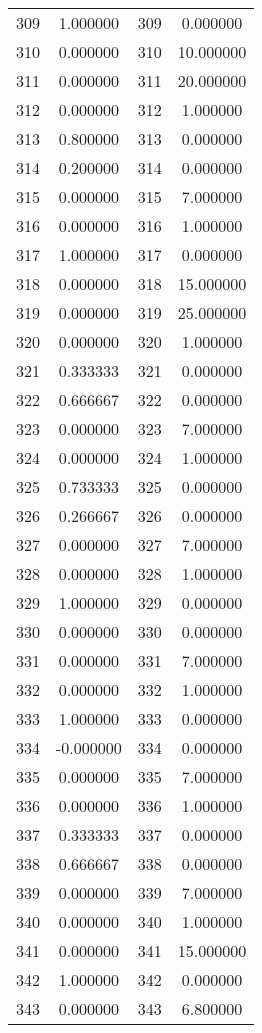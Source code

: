 \documentclass[12pt]{article}
\begin{document}
\begin{longtable}{@{}cccc@{}}
309 & 1.000000 & 309 & 0.000000 \\
310 & 0.000000 & 310 & 10.000000 \\
311 & 0.000000 & 311 & 20.000000 \\
312 & 0.000000 & 312 & 1.000000 \\
313 & 0.800000 & 313 & 0.000000 \\
314 & 0.200000 & 314 & 0.000000 \\
315 & 0.000000 & 315 & 7.000000 \\
316 & 0.000000 & 316 & 1.000000 \\
317 & 1.000000 & 317 & 0.000000 \\
318 & 0.000000 & 318 & 15.000000 \\
319 & 0.000000 & 319 & 25.000000 \\
320 & 0.000000 & 320 & 1.000000 \\
321 & 0.333333 & 321 & 0.000000 \\
322 & 0.666667 & 322 & 0.000000 \\
323 & 0.000000 & 323 & 7.000000 \\
324 & 0.000000 & 324 & 1.000000 \\
325 & 0.733333 & 325 & 0.000000 \\
326 & 0.266667 & 326 & 0.000000 \\
327 & 0.000000 & 327 & 7.000000 \\
328 & 0.000000 & 328 & 1.000000 \\
329 & 1.000000 & 329 & 0.000000 \\
330 & 0.000000 & 330 & 0.000000 \\
331 & 0.000000 & 331 & 7.000000 \\
332 & 0.000000 & 332 & 1.000000 \\
333 & 1.000000 & 333 & 0.000000 \\
334 & -0.000000 & 334 & 0.000000 \\
335 & 0.000000 & 335 & 7.000000 \\
336 & 0.000000 & 336 & 1.000000 \\
337 & 0.333333 & 337 & 0.000000 \\
338 & 0.666667 & 338 & 0.000000 \\
339 & 0.000000 & 339 & 7.000000 \\
340 & 0.000000 & 340 & 1.000000 \\
341 & 0.000000 & 341 & 15.000000 \\
342 & 1.000000 & 342 & 0.000000 \\
343 & 0.000000 & 343 & 6.800000 \\

\end{longtable}
\end{document}
